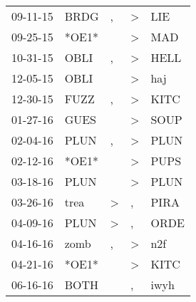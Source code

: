 \begin{supertabular}{p{0.07\textwidth}p{0.06\textwidth}p{0.02\textwidth}p{0.02\textwidth}p{0.06\textwidth}}
          09-11-15\textsuperscript{} &           BRDG\textsuperscript{} &                , &     \textgreater &            LIE\textsuperscript{} \\
          09-25-15\textsuperscript{} &                            *OE1* &                  &     \textgreater &            MAD\textsuperscript{} \\
          10-31-15\textsuperscript{} &           OBLI\textsuperscript{} &                , &     \textgreater &           HELL\textsuperscript{} \\
          12-05-15\textsuperscript{} &           OBLI\textsuperscript{} &                  &     \textgreater &            haj\textsuperscript{} \\
          12-30-15\textsuperscript{} &           FUZZ\textsuperscript{} &                , &     \textgreater &           KITC\textsuperscript{} \\
          01-27-16\textsuperscript{} &           GUES\textsuperscript{} &                  &     \textgreater &           SOUP\textsuperscript{} \\
          02-04-16\textsuperscript{} &           PLUN\textsuperscript{} &                , &     \textgreater &           PLUN\textsuperscript{} \\
          02-12-16\textsuperscript{} &                            *OE1* &                  &     \textgreater &           PUPS\textsuperscript{} \\
          03-18-16\textsuperscript{} &           PLUN\textsuperscript{} &                  &     \textgreater &           PLUN\textsuperscript{} \\
          03-26-16\textsuperscript{} &           trea\textsuperscript{} &     \textgreater &                , &           PIRA\textsuperscript{} \\
          04-09-16\textsuperscript{} &           PLUN\textsuperscript{} &     \textgreater &                , &           ORDE\textsuperscript{} \\
          04-16-16\textsuperscript{} &           zomb\textsuperscript{} &                , &     \textgreater &            n2f\textsuperscript{} \\
          04-21-16\textsuperscript{} &                            *OE1* &                  &     \textgreater &           KITC\textsuperscript{} \\
          06-16-16\textsuperscript{} &           BOTH\textsuperscript{} &                  &                , &           iwyh\textsuperscript{} \\

\end{supertabular}
